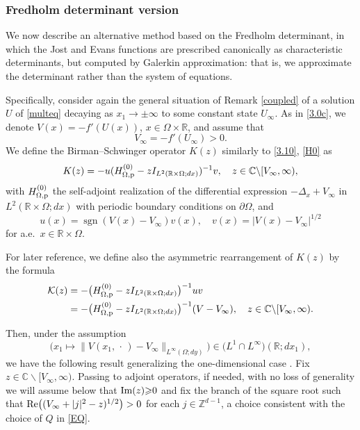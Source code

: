 \subsubsection{Fredholm determinant version}\label{fred}
We now describe an alternative method based on the Fredholm
determinant, in which the Jost and Evans functions are prescribed canonically
as characteristic determinants, but computed by Galerkin
approximation: that is, we approximate the determinant rather
than the system of equations.

Specifically, consider again the general situation of Remark \ref{coupled}
of a solution $U$ of \eqref{multeq} decaying as $x_1\to \pm \infty$
to some constant state $U_\infty$. As in \eqref{3.0c},
we denote $V(x)=-f'(U(x))$, $x\in\Omega\times{{\mathbb{R}}}$, and
assume that
\begin{equation}\label{posass}
V_\infty =-f'(U_\infty)>0.
\end{equation}
We define the Birman--Schwinger operator $K(z)$ similarly to
\eqref{3.10}, \eqref{H0} as
\begin{equation}\label{K}
K(z)= -u(H^{(0)}_{\Omega, \rm p} -zI_{L^2({{\mathbb{R}}}\times\Omega; dx)})^{-1}v, 
\quad z\in{{\mathbb{C}}}\backslash[V_\infty,\infty),
\end{equation}
with $H^{(0)}_{\Omega, \rm p}$ the self-adjoint realization of the differential expression 
$-\Delta_x +V_\infty$ in $L^2({{\mathbb{R}}}\times\Omega; dx)$ with periodic boundary conditions on $\partial\Omega$, and
\begin{equation}
u(x) = \operatorname{sgn}(V(x)-V_\infty) v(x), \quad v(x) = |V(x)-V_\infty|^{1/2}
\end{equation}
for a.e.\ $x \in {{\mathbb{R}}}\times\Omega$.

For later reference, we define also the asymmetric
rearrangement of $K(z)$ by the formula
\begin{align}\label{tK} 
{{\mathcal K}}(z) &= - \big(H^{(0)}_{\Omega, \rm p}-zI_{L^2({{\mathbb{R}}}\times\Omega; dx)}\big)^{-1}uv  
{\notag}  \\
& = -\big(H^{(0)}_{\Omega, \rm p} -zI_{L^2({{\mathbb{R}}}\times\Omega; dx)}\big)^{-1}(V-V_\infty),  
\quad z\in{{\mathbb{C}}}\backslash[V_\infty,\infty).
\end{align}

Then, under the assumption
\begin{equation}\label{L1}
\big(x_1 \mapsto \|V(x_1,{\,\cdot\,}) - V_\infty\|_{L^\infty(\Omega; dy)}\big)
\in \big(L^1\cap L^\infty\big)({{\mathbb{R}}};dx_1),
\end{equation}
we have the following result generalizing
the one-dimensional case \cite[Lemma 2.9]{GLM07}.
Fix $z\in{{\mathbb{C}}}\backslash[V_\infty,\infty)$. Passing to
adjoint operators, if needed, with no loss of generality
we will assume below that ${\text{\rm Im}} (z) {\geqslant}0$ and
fix the branch of the square root
such that ${\text{\rm Re}}\big((V_\infty + |j|^2-z)^{1/2}\big)>0$
for each $j\in{{\mathbb{Z}}}^{d-1}$, a choice consistent with the choice of $Q$ in \eqref{EQ}.

